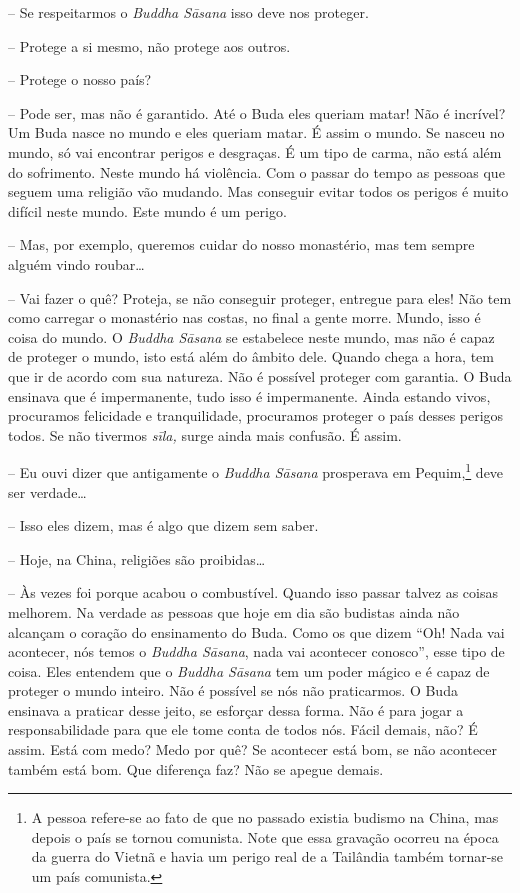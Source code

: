 -- Se respeitarmos o \textit{Buddha Sāsana} isso deve nos
proteger.

-- Protege a si mesmo, não protege aos outros.

-- Protege o nosso país?

-- Pode ser, mas não é garantido. Até o Buda eles queriam matar!
Não é incrível? Um Buda nasce no mundo e eles queriam matar. É assim o
mundo. Se nasceu no mundo, só vai encontrar perigos e desgraças. É um
tipo de carma, não está além do sofrimento. Neste mundo há violência.
Com o passar do tempo as pessoas que seguem uma religião vão mudando.
Mas conseguir evitar todos os perigos é muito difícil neste mundo. Este
mundo é um perigo.

-- Mas, por exemplo, queremos cuidar do nosso monastério, mas tem
sempre alguém vindo roubar…

-- Vai fazer o quê? Proteja, se não conseguir proteger, entregue
para eles! Não tem como carregar o monastério nas costas, no final a
gente morre. Mundo, isso é coisa do mundo. O \textit{Buddha Sāsana}
se estabelece neste mundo, mas não é capaz de proteger o mundo, isto
está além do âmbito dele. Quando chega a hora, tem que ir de acordo com
sua natureza. Não é possível proteger com garantia. O Buda ensinava que
é impermanente, tudo isso é impermanente. Ainda estando vivos,
procuramos felicidade e tranquilidade, procuramos proteger o país
desses perigos todos. Se não tivermos \textit{sīla,} surge ainda
mais confusão. É assim.

-- Eu ouvi dizer que antigamente o \textit{Buddha Sāsana
}prosperava em Pequim,\footnote{A pessoa refere-se ao fato de que no
passado existia budismo na China, mas depois o país se tornou
comunista. Note que essa gravação ocorreu na época da guerra do Vietnã
e havia um perigo real de a Tailândia também tornar-se um país
comunista.} deve ser verdade…

-- Isso eles dizem, mas é algo que dizem sem saber.

-- Hoje, na China, religiões são proibidas…

-- Às vezes foi porque acabou o combustível. Quando isso passar
talvez as coisas melhorem. Na verdade as pessoas que hoje em dia são
budistas ainda não alcançam o coração do ensinamento do Buda. Como os
que dizem “Oh! Nada vai acontecer, nós temos o \textit{Buddha
Sāsana}, nada vai acontecer conosco”, esse tipo de coisa. Eles
entendem que o \textit{Buddha Sāsana} tem um poder mágico e é capaz
de proteger o mundo inteiro. Não é possível se nós não praticarmos. O
Buda ensinava a praticar desse jeito, se esforçar dessa forma. Não é
para jogar a responsabilidade para que ele tome conta de todos nós.
Fácil demais, não? É assim. Está com medo? Medo por quê? Se acontecer
está bom, se não acontecer também está bom. Que diferença faz? Não se
apegue demais.

